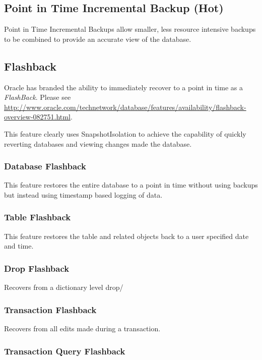 \subsection{Point in Time Incremental Backup (Hot)}
Point in Time Incremental Backups allow smaller, less resource intensive backups
to be combined to provide an accurate view of the database.

\subsection{Flashback}

Oracle has branded the ability to immediately recover to a point in time as a
\emph{FlashBack}.  Please see
\url{http://www.oracle.com/technetwork/database/features/availability/flashback-overview-082751.html}.

This feature clearly uses SnapshotIsolation to achieve the capability of quickly
reverting databases and viewing changes made the database.

\subsubsection{Database Flashback}
This feature restores the entire database to a point in time without using
backups but instead using timestamp based logging of data.

\subsubsection{Table Flashback}

This feature restores the table and related objects back to a user specified
date and time.

\subsubsection{Drop Flashback}

Recovers from a dictionary level drop/

\subsubsection{Transaction Flashback}

Recovers from all edits made during a transaction.

\subsubsection{Transaction Query Flashback}

